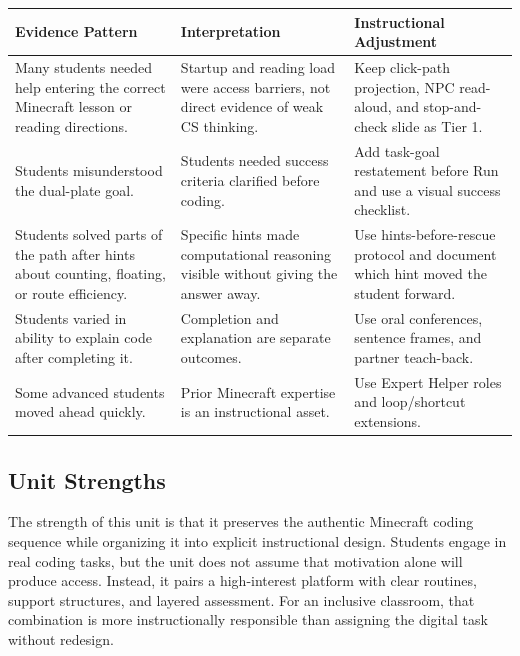 \documentclass[12pt]{article}
\newcommand{\arow}{\rowcolor{altRow}}
\begin{document}
\begin{assessbox}
\begin{tabularx}{\textwidth}{|P{1.7in}|P{2.2in}|L|}
\hline
{}\color{white}\bfseries Evidence Pattern & \color{white}\bfseries Interpretation & \color{white}\bfseries Instructional Adjustment \\
\hline
Many students needed help entering the correct Minecraft lesson or reading directions. & Startup and reading load were access barriers, not direct evidence of weak CS thinking. & Keep click-path projection, NPC read-aloud, and stop-and-check slide as Tier 1. \\
\hline
\arow Students misunderstood the dual-plate goal. & Students needed success criteria clarified before coding. & Add task-goal restatement before Run and use a visual success checklist. \\
\hline
Students solved parts of the path after hints about counting, floating, or route efficiency. & Specific hints made computational reasoning visible without giving the answer away. & Use hints-before-rescue protocol and document which hint moved the student forward. \\
\hline
\arow Students varied in ability to explain code after completing it. & Completion and explanation are separate outcomes. & Use oral conferences, sentence frames, and partner teach-back. \\
\hline
Some advanced students moved ahead quickly. & Prior Minecraft expertise is an instructional asset. & Use Expert Helper roles and loop/shortcut extensions. \\
\hline
\end{tabularx}
\end{assessbox}

\subsection{Unit Strengths}

The strength of this unit is that it preserves the authentic Minecraft coding sequence while organizing it into explicit instructional design. Students engage in real coding tasks, but the unit does not assume that motivation alone will produce access. Instead, it pairs a high-interest platform with clear routines, support structures, and layered assessment. For an inclusive classroom, that combination is more instructionally responsible than assigning the digital task without redesign.
\end{document}
